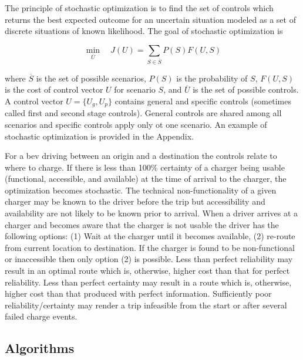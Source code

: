 \documentclass[12pt]{article}
\begin{document}
The principle of stochastic optimization is to find the set of controls which returns the best expected outcome for an uncertain situation modeled as a set of discrete situations of known likelihood. The goal of stochastic optimization is

\begin{equation}
	\min_{\overline{U}}\quad J(U)=\sum_{S\in\overline{S}} P(S)F(U,S)\label{eq:stochastic_optimization}
\end{equation}

where $\overline{S}$ is the set of possible scenarios, $P(S)$ is the probability of $S$, $F(U,S)$ is the cost of control vector $U$ for scenario $S$, and $\overline{U}$ is the set of possible controls. A control vector $U=\{U_g,U_p\}$ contains general and specific controls (sometimes called first and second stage controls). General controls are shared among all scenarios and specific controls apply only ot one scenario. An example of stochastic optimization is provided in the Appendix.

For a \gls{bev} driving between an origin and a destination the controls relate to where to charge. If there is less than 100\% certainty of a charger being usable (functional, accessible, and available) at the time of arrival to the charger, the optimization becomes stochastic. The technical non-functionality of a given charger may be known to the driver before the trip but accessibility and availability are not likely to be known prior to arrival. When a driver arrives at a charger and becomes aware that the charger is not usable the driver has the following options: (1) Wait at the charger until it becomes available, (2) re-route from current location to destination. If the charger is found to be non-functional or inaccessible then only option (2) is possible. Less than perfect reliability may result in an optimal route which is, otherwise, higher cost than that for perfect reliability. Less than perfect certainty may result in a route which is, otherwise, higher cost than that produced with perfect information. Sufficiently poor reliability/certainty may render a trip infeasible from the start or after several failed charge events.

\subsection*{Algorithms}
\end{document}
